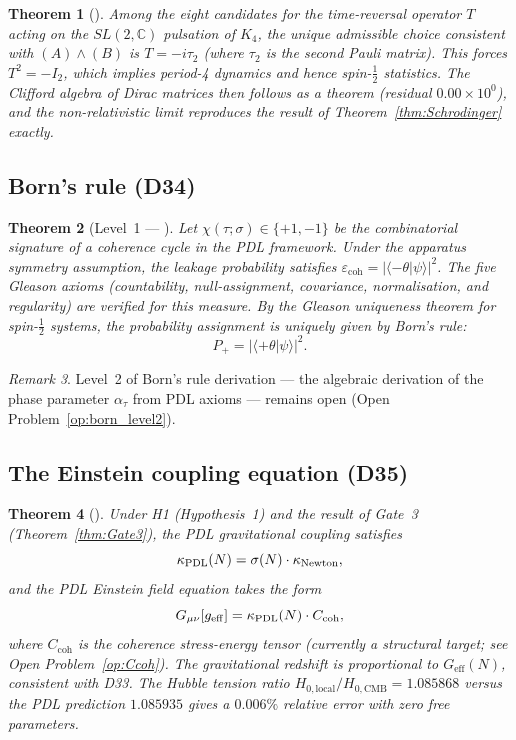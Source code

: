 \documentclass[11pt,a4paper]{article}
\theoremstyle{plain}
\newtheorem{theorem}{Theorem}[section]
\theoremstyle{definition}
\theoremstyle{remark}
\newtheorem{remark}[theorem]{Remark}
\newcommand{\PDL}{\textnormal{PDL}}
\newcommand{\Kfour}{K_4}
\newcommand{\Geff}{G_{\mathrm{eff}}}
\begin{document}
\begin{theorem}[\citep{D33}]
\label{thm:Dirac}
Among the eight candidates for the time-reversal operator $T$ acting on the $SL(2,\mathbb{C})$ pulsation of $\Kfour$, the unique admissible choice consistent with $(A)\wedge(B)$ is $T=-i\tau_2$ (where $\tau_2$ is the second Pauli matrix).
This forces $T^2=-I_2$, which implies period-4 dynamics and hence spin-$\tfrac{1}{2}$ statistics.
The Clifford algebra of Dirac matrices then follows as a theorem (residual $0.00\times10^0$), and the non-relativistic limit reproduces the result of Theorem~\ref{thm:Schrodinger} exactly.
\end{theorem}

\subsection{Born's rule (D34)}
\label{subsec:born}

\begin{theorem}[Level~1 — \citep{D34}]
\label{thm:Born}
Let $\chi(\tau;\sigma)\in\{+1,-1\}$ be the combinatorial signature of a coherence cycle in the PDL framework.
Under the apparatus symmetry assumption, the leakage probability satisfies $\varepsilon_{\mathrm{coh}}=|\langle{-\theta}|\psi\rangle|^2$.
The five Gleason axioms (countability, null-assignment, covariance, normalisation, and regularity) are verified for this measure.
By the Gleason uniqueness theorem for spin-$\tfrac{1}{2}$ systems, the probability assignment is uniquely given by Born's rule:
\[
P_+ = |\langle{+\theta}|\psi\rangle|^2.
\]
\end{theorem}

\begin{remark}
Level~2 of Born's rule derivation — the algebraic derivation of the phase parameter $\alpha_\tau$ from PDL axioms — remains open (Open Problem~\ref{op:born_level2}).
\end{remark}

\subsection{The Einstein coupling equation (D35)}
\label{subsec:einstein}

\begin{theorem}[\citep{D35}]
\label{thm:Einstein}
Under H1 (Hypothesis~1) and the result of Gate~3 (Theorem~\ref{thm:Gate3}), the PDL gravitational coupling satisfies
\[
\kappa_{\PDL}(N) = \sigma(N)\cdot\kappa_{\mathrm{Newton}},
\]
and the PDL Einstein field equation takes the form
\[
G_{\mu\nu}[g_{\mathrm{eff}}] = \kappa_{\PDL}(N)\cdot C_{\mathrm{coh}},
\]
where $C_{\mathrm{coh}}$ is the coherence stress-energy tensor (currently a structural target; see Open Problem~\ref{op:Ccoh}).
The gravitational redshift is proportional to $\Geff(N)$, consistent with D33.
The Hubble tension ratio $H_{0,\mathrm{local}}/H_{0,\mathrm{CMB}}=1.085868$ versus the PDL prediction $1.085935$ gives a $0.006\%$ relative error with zero free parameters.
\end{theorem}
\end{document}
